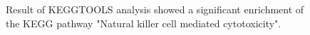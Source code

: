 \documentclass[11pt,a4paper]{article}
\begin{document}

\begin{figure}

    \caption{Result of KEGGTOOLS analysis showed a significant enrichment of the KEGG pathway "Natural killer cell
    mediated cytotoxicity".}
\end{figure}
\end{document}
